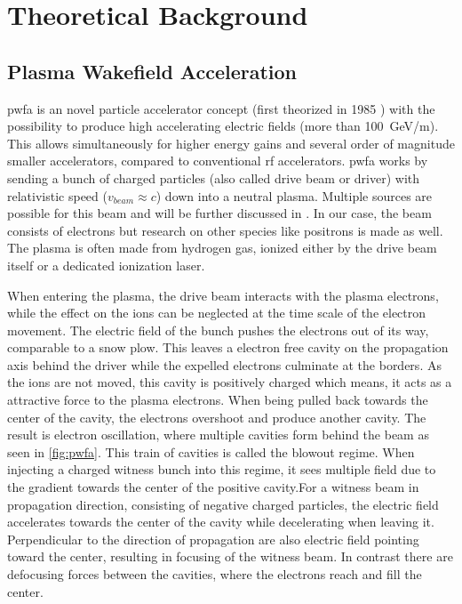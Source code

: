 \documentclass[bachelor_thesis]{subfiles}
\begin{document}
\chapter{Theoretical Background}
\section{Plasma Wakefield Acceleration}
\Gls{pwfa} is an novel particle accelerator concept (first theorized in 1985 \cite{chen1985}) with the possibility to produce high accelerating electric fields (more than \qty{100}{\GeV/\m}). This allows simultaneously for higher energy gains 
and several order of magnitude smaller accelerators, compared to conventional \gls{rf} accelerators.
\Gls{pwfa} works by sending a bunch of charged particles (also called drive beam or driver) with relativistic speed ($v_{beam}\approx c$) down into a neutral plasma. Multiple sources are possible for this beam and will be further discussed in \label{chap:lpfwa}.
In our case, the beam consists of electrons but research on other species like positrons \cite{Gessner2016} is made as well. The plasma is often made from hydrogen gas, ionized either by the drive beam itself or a dedicated ionization laser.

When entering the plasma, the drive beam interacts with the plasma electrons, while the effect on the ions can be neglected at the time scale of the electron movement. The electric field of the bunch pushes the electrons out of its way, comparable to a snow plow. 
This leaves a electron free cavity on the propagation axis behind the driver while the expelled electrons culminate at the borders. As the ions are not moved, this cavity is positively charged which means, it acts as a attractive force to the plasma electrons.
When being pulled back towards the center of the cavity, the electrons overshoot and produce another cavity. The result is electron oscillation, where multiple cavities form behind the beam as seen in \autoref{fig:pwfa}.
This train  of cavities is called the blowout regime. When injecting a charged witness bunch into this regime, it sees multiple field due to the gradient towards the center of the positive cavity.For a witness beam in propagation direction, 
consisting of negative charged particles, the electric field accelerates towards the center of the cavity while decelerating when leaving it. Perpendicular to the direction of propagation are also electric field pointing toward the center, resulting in focusing of the witness beam. 
In contrast there are defocusing forces between the cavities, where the electrons reach and fill the center. 
\end{document}
